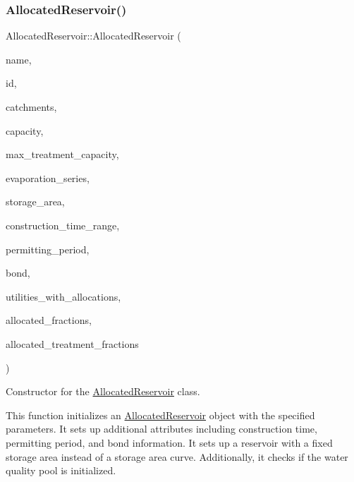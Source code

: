 \subsubsection{\texorpdfstring{Allocated\+Reservoir()}{AllocatedReservoir()}\hspace{0.1cm}{\footnotesize\ttfamily [4/5]}}
{\footnotesize\ttfamily Allocated\+Reservoir\+::\+Allocated\+Reservoir (\begin{DoxyParamCaption}\item[{const char $\ast$}]{name,  }\item[{const int}]{id,  }\item[{const vector$<$ \mbox{\hyperlink{classCatchment}{Catchment}} $\ast$$>$ \&}]{catchments,  }\item[{const double}]{capacity,  }\item[{const double}]{max\+\_\+treatment\+\_\+capacity,  }\item[{Evaporation\+Series \&}]{evaporation\+\_\+series,  }\item[{double}]{storage\+\_\+area,  }\item[{const vector$<$ double $>$ \&}]{construction\+\_\+time\+\_\+range,  }\item[{double}]{permitting\+\_\+period,  }\item[{\mbox{\hyperlink{classBond}{Bond}} \&}]{bond,  }\item[{vector$<$ int $>$ $\ast$}]{utilities\+\_\+with\+\_\+allocations,  }\item[{vector$<$ double $>$ $\ast$}]{allocated\+\_\+fractions,  }\item[{vector$<$ double $>$ $\ast$}]{allocated\+\_\+treatment\+\_\+fractions }\end{DoxyParamCaption})}



Constructor for the \mbox{\hyperlink{classAllocatedReservoir}{Allocated\+Reservoir}} class. 

This function initializes an \mbox{\hyperlink{classAllocatedReservoir}{Allocated\+Reservoir}} object with the specified parameters. It sets up additional attributes including construction time, permitting period, and bond information. It sets up a reservoir with a fixed storage area instead of a storage area curve. Additionally, it checks if the water quality pool is initialized.


